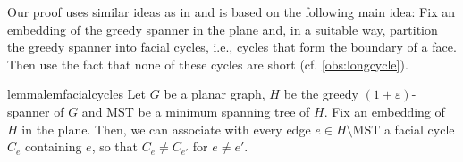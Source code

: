 \documentclass[a4paper,cleveref, autoref, thm-restate, thm-restate, UKenglish]{lipics-v2021}
\newcommand{\mst}{\mathrm{MST}}
\renewcommand{\epsilon}{\varepsilon}
\begin{document}
Our proof uses similar ideas as in \cite[Theorem 1]{megow} and is based on the following main idea: 
Fix an embedding of the greedy spanner in the plane and, in a suitable way, partition the greedy spanner into facial cycles, i.e., cycles that form the boundary of a face. 
Then use the fact that none of these cycles are short {(cf. \cref{obs:longcycle})}.

\begin{restatable}{lemma}{lemfacialcycles}\label{lem:facialcycles}
Let $G$ be a planar graph, $H$ be the greedy $(1+\epsilon)$-spanner of $G$ and $\mst$ be a minimum spanning tree of $H$. Fix an embedding of $H$ in the plane. Then, we can associate with every edge $e\in H \setminus \mst$ a facial cycle $C_e$ containing $e$, so that $C_e\neq C_{e'}$ for $e \neq e'$.
\end{restatable}
\end{document}
